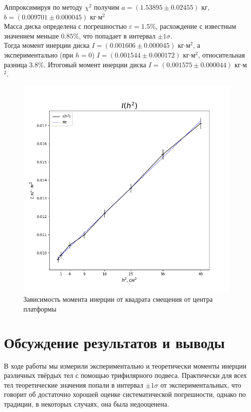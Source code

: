 \documentclass[a4paper,12pt]{article}
\begin{document}
	Аппроксимируя по методу $\chi^2$ получим $a=(1.53895\pm 0.02455)$ кг, $b=(0.009701\pm 0.000045)$ кг$\cdot$м$^2$\\
	
	Масса диска определена с погрешностью $\varepsilon=1.5\%$, расхождение с известным значением меньше $0.85\%$, что попадает в интервал $\pm 1\sigma$.\\
	
	Тогда момент инерции диска $I=(0.001606\pm 0.000045)$ кг$\cdot$м$^2$, а экспериментально (при $h=0$) $I=(0.001544\pm 0.000172)$ кг$\cdot$м$^2$, относительная разница $3.8\%$. Итоговый момент инерции диска $I=(0.001575\pm 0.000044)$ кг$\cdot$м$^2$.
	
	\begin{figure}[H]
		\centering
		\includegraphics[width=\linewidth]{Figure_1}
		\caption{Зависимость момента инерции от квадрата смещения от центра платформы}
		\label{fig:figure1}
	\end{figure}
	
	
	\section{Обсуждение результатов и выводы}
	
	В ходе работы мы измерили экспериментально и теоретически моменты инерции различных твёрдых тел с помощью трифилярного подвеса. Практически для всех тел теоретические значения попали в интервал $\pm 1\sigma$ от экспериментальных, что говорит об достаточно хорошей оценке систематической погрешности, однако по традиции, в некоторых случаях, она была недооценена.\\
	
\end{document}

